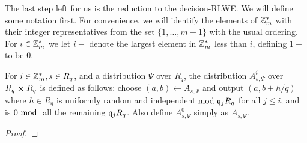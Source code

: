 The last step left for us is the reduction to the decision-RLWE. We will define some notation first. For convenience, we will identify the elements of $\Z_m^*$ with their integer representatives from the set $\{1, \ldots, m-1\}$ with the usual ordering. For $i \in \Z_m^*$ we let $i-$ denote the largest element in $\Z_m^*$ less than $i$, defining $1-$ to be 0.
\begin{definition}
	For $i \in \Z_m^*, s \in R_q$, and a distribution $\Psi$ over $R_q$, the
	distribution $A^i_{s,\Psi}$ over $R_q \cross R_q$ is defined as follows: choose $(a, b) \leftarrow A_{s, \Psi}$ and output $(a, b + h/q)$ where $h \in R_q$ is uniformly random and independent$\mod \q_j R_q$ for all $j \leq i$, and is $0 \mod$ all the remaining $\q_j R_q$. Also define $A^0_{s,\Psi}$ simply as $A_{s,\Psi}$.
\end{definition}
\begin{lemma}
\end{lemma}
\begin{proof}
\end{proof}

